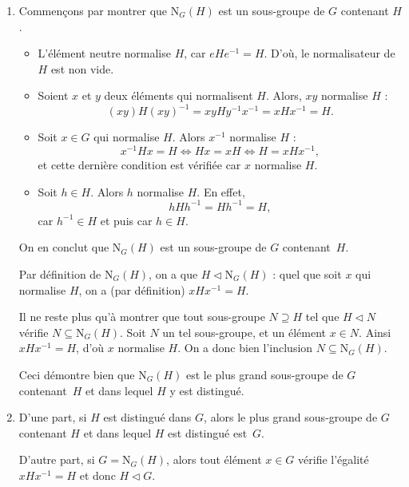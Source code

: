 \documentclass[./main]{subfiles}
\begin{document}
  \begin{enumerate}
    \item Commençons par montrer que $\mathrm{N}_G(H)$ est un sous-groupe de $G$ contenant $H$.
      \begin{itemize}
        \item L'élément neutre normalise $H$, car $e H e^{-1} = H$.
          D'où, le normalisateur de $H$ est non vide.
        \item Soient $x$ et $y$ deux éléments qui normalisent $H$.
          Alors, $xy$ normalise $H$ : \[
            (xy)H(xy)^{-1} = x y H y^{-1}x^{-1} = x H x^{-1} = H
          .\]
        \item Soit $x \in G$ qui normalise $H$.
          Alors $x^{-1}$ normalise $H$ : \[
          x^{-1} H x = H \iff H x = x H \iff H = x H x^{-1}
          ,\] et cette dernière condition est vérifiée car $x$ normalise $H$.
        \item Soit $h \in H$. Alors $h$ normalise $H$.
          En effet, \[
            h H h^{-1} = H h^{-1} = H
          ,\] car $h^{-1} \in H$ et puis car $h \in H$.
      \end{itemize}
      On en conclut que $\mathrm{N}_G(H)$ est un sous-groupe de $G$ contenant~$H$.

      Par définition de $\mathrm{N}_G(H)$, on a que $H \triangleleft \mathrm{N}_G(H)$ : quel que soit $x$ qui normalise $H$, on a (par définition) $x H x^{-1} = H$.

      Il ne reste plus qu'à montrer que tout sous-groupe $N \supseteq H$ tel que $H \triangleleft N$ vérifie $N \subseteq \mathrm{N}_G(H)$.
      Soit $N$ un tel sous-groupe, et un élément $x \in N$. Ainsi $x H x^{-1} = H$, d'où $x$ normalise $H$.
      On a donc bien l'inclusion $N \subseteq \mathrm{N}_G(H)$.

      Ceci démontre bien que $\mathrm{N}_G(H)$ est le plus grand sous-groupe de $G$ contenant~$H$ et dans lequel $H$ y est distingué.
    \item D'une part, si $H$ est distingué dans $G$, alors le plus grand sous-groupe de $G$ contenant $H$ et dans lequel $H$ est distingué est~$G$.

      D'autre part, si $G = \mathrm{N}_G(H)$, alors tout élément $x \in G$ vérifie l'égalité $x H x^{-1} = H$ et donc $H \triangleleft G$.
  \end{enumerate}
\end{document}
